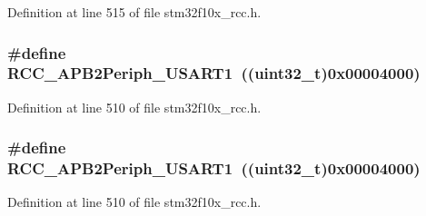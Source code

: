 Definition at line 515 of file stm32f10x\+\_\+rcc.\+h.

\subsubsection[{\texorpdfstring{R\+C\+C\+\_\+\+A\+P\+B2\+Periph\+\_\+\+U\+S\+A\+R\+T1}{RCC_APB2Periph_USART1}}]{\setlength{\rightskip}{0pt plus 5cm}\#define R\+C\+C\+\_\+\+A\+P\+B2\+Periph\+\_\+\+U\+S\+A\+R\+T1~(({\bf uint32\+\_\+t})0x00004000)}\hypertarget{group___a_p_b2__peripheral_ga14e1b3b6d84801c223a37a954b5b1910}{}\label{group___a_p_b2__peripheral_ga14e1b3b6d84801c223a37a954b5b1910}


Definition at line 510 of file stm32f10x\+\_\+rcc.\+h.

\subsubsection[{\texorpdfstring{R\+C\+C\+\_\+\+A\+P\+B2\+Periph\+\_\+\+U\+S\+A\+R\+T1}{RCC_APB2Periph_USART1}}]{\setlength{\rightskip}{0pt plus 5cm}\#define R\+C\+C\+\_\+\+A\+P\+B2\+Periph\+\_\+\+U\+S\+A\+R\+T1~(({\bf uint32\+\_\+t})0x00004000)}\hypertarget{group___a_p_b2__peripheral_ga14e1b3b6d84801c223a37a954b5b1910}{}\label{group___a_p_b2__peripheral_ga14e1b3b6d84801c223a37a954b5b1910}


Definition at line 510 of file stm32f10x\+\_\+rcc.\+h.

